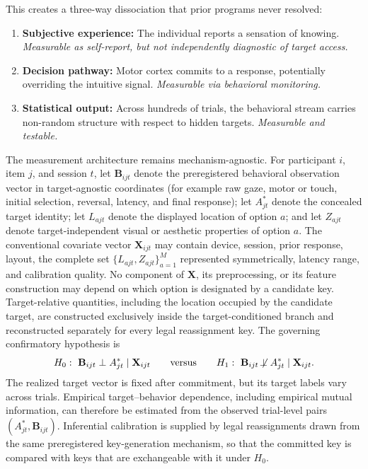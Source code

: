 \documentclass[11pt,letterpaper]{article}
\begin{document}
This creates a three-way dissociation that prior programs never resolved:

\begin{enumerate}[nosep]
    \item \textbf{Subjective experience:} The individual reports a sensation of knowing. \textit{Measurable as self-report, but not independently diagnostic of target access.}
    \item \textbf{Decision pathway:} Motor cortex commits to a response, potentially overriding the intuitive signal. \textit{Measurable via behavioral monitoring.}
    \item \textbf{Statistical output:} Across hundreds of trials, the behavioral stream carries non-random structure with respect to hidden targets. \textit{Measurable and testable.}
\end{enumerate}

The measurement architecture remains mechanism-agnostic. For participant $i$, item $j$, and session $t$, let $\mathbf{B}_{ijt}$ denote the preregistered behavioral observation vector in target-agnostic coordinates (for example raw gaze, motor or touch, initial selection, reversal, latency, and final response); let $A^*_{jt}$ denote the concealed target identity; let $L_{ajt}$ denote the displayed location of option $a$; and let $Z_{ajt}$ denote target-independent visual or aesthetic properties of option $a$. The conventional covariate vector $\mathbf{X}_{ijt}$ may contain device, session, prior response, layout, the complete set $\{L_{ajt},Z_{ajt}\}_{a=1}^{M}$ represented symmetrically, latency range, and calibration quality. No component of $\mathbf{X}$, its preprocessing, or its feature construction may depend on which option is designated by a candidate key. Target-relative quantities, including the location occupied by the candidate target, are constructed exclusively inside the target-conditioned branch and reconstructed separately for every legal reassignment key. The governing confirmatory hypothesis is
\begin{equation}
H_0:\ \mathbf{B}_{ijt} \perp A^*_{jt}\mid\mathbf{X}_{ijt}
\qquad\text{versus}\qquad
H_1:\ \mathbf{B}_{ijt} \not\!\perp A^*_{jt}\mid\mathbf{X}_{ijt}.
\label{eq:core}
\end{equation}
The realized target vector is fixed after commitment, but its target labels vary across trials. Empirical target--behavior dependence, including empirical mutual information, can therefore be estimated from the observed trial-level pairs $(A^*_{jt},\mathbf{B}_{ijt})$. Inferential calibration is supplied by legal reassignments drawn from the same preregistered key-generation mechanism, so that the committed key is compared with keys that are exchangeable with it under $H_0$.
\end{document}

